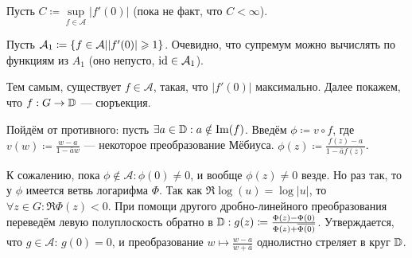 \documentclass[a4paper]{report}
\begin{document}
{{{                Пусть $C \coloneqq \sup\limits_{f \in \mathcal{A}}|f'(0)|$ (пока не факт, что $C < \infty$).

                Пусть $\mathcal{A}_1 \coloneqq \left\{f \in \mathcal{A}\middle||f'(0)| \geqslant 1\right\}$.
                Очевидно, что супремум можно вычислять по функциям из $A_1$ (оно непусто, $\operatorname{id} \in \mathcal{A}_1$).



                Тем самым, существует $f \in \mathcal{A}$, такая, что $|f'(0)|$ максимально.
                Далее покажем, что $f: G \rightarrow \mathbb{D}$ --- сюръекция.

                \item Пойдём от противного: пусть $\exists a \in \mathbb{D}: a \notin \operatorname{Im}(f)$.
                Введём $\phi \coloneqq v \circ f$, где $v(w) \coloneqq \frac{w - a}{1 - \overline{a}w}$ --- некоторое преобразование Мёбиуса.
                $\phi(z) \coloneqq \frac{f(z) - a}{1 - \overline{a}f(z)}$.

                К сожалению, пока $\phi \notin \mathcal{A}: \phi(0) \ne 0$, и вообще $\phi(z) \ne 0$ везде.
                Но раз так, то у $\phi$ имеется ветвь логарифма $\Phi$.
                Так как $\Re\log(u) = \log|u|$, то $\forall z \in G: \Re\Phi(z) < 0$.
                При помощи другого дробно-линейного преобразования переведём левую полуплоскость обратно в $\mathbb{D}: g(z) \coloneqq \frac{\Phi(z) - \Phi(0)}{\Phi(z) + \overline{\Phi(0)}}$.
                Утверждается, что $g \in \mathcal{A}$: $g(0) = 0$, и преобразование $w \mapsto \frac{w - a}{w + \overline{a}}$ однолистно стреляет в круг $\mathbb{D}$.

}}}
\end{document}
